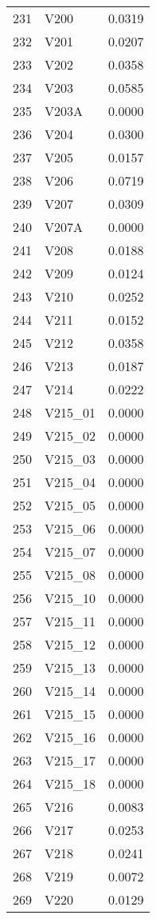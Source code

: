 \documentclass{amsart}
\begin{document}
\begin{longtable}{rlr}
  231 & V200 & 0.0319 \\ 
  232 & V201 & 0.0207 \\ 
  233 & V202 & 0.0358 \\ 
  234 & V203 & 0.0585 \\ 
  235 & V203A & 0.0000 \\ 
  236 & V204 & 0.0300 \\ 
  237 & V205 & 0.0157 \\ 
  238 & V206 & 0.0719 \\ 
  239 & V207 & 0.0309 \\ 
  240 & V207A & 0.0000 \\ 
  241 & V208 & 0.0188 \\ 
  242 & V209 & 0.0124 \\ 
  243 & V210 & 0.0252 \\ 
  244 & V211 & 0.0152 \\ 
  245 & V212 & 0.0358 \\ 
  246 & V213 & 0.0187 \\ 
  247 & V214 & 0.0222 \\ 
  248 & V215\_01 & 0.0000 \\ 
  249 & V215\_02 & 0.0000 \\ 
  250 & V215\_03 & 0.0000 \\ 
  251 & V215\_04 & 0.0000 \\ 
  252 & V215\_05 & 0.0000 \\ 
  253 & V215\_06 & 0.0000 \\ 
  254 & V215\_07 & 0.0000 \\ 
  255 & V215\_08 & 0.0000 \\ 
  256 & V215\_10 & 0.0000 \\ 
  257 & V215\_11 & 0.0000 \\ 
  258 & V215\_12 & 0.0000 \\ 
  259 & V215\_13 & 0.0000 \\ 
  260 & V215\_14 & 0.0000 \\ 
  261 & V215\_15 & 0.0000 \\ 
  262 & V215\_16 & 0.0000 \\ 
  263 & V215\_17 & 0.0000 \\ 
  264 & V215\_18 & 0.0000 \\ 
  265 & V216 & 0.0083 \\ 
  266 & V217 & 0.0253 \\ 
  267 & V218 & 0.0241 \\ 
  268 & V219 & 0.0072 \\ 
  269 & V220 & 0.0129 \\ 

\end{longtable}
\end{document}
